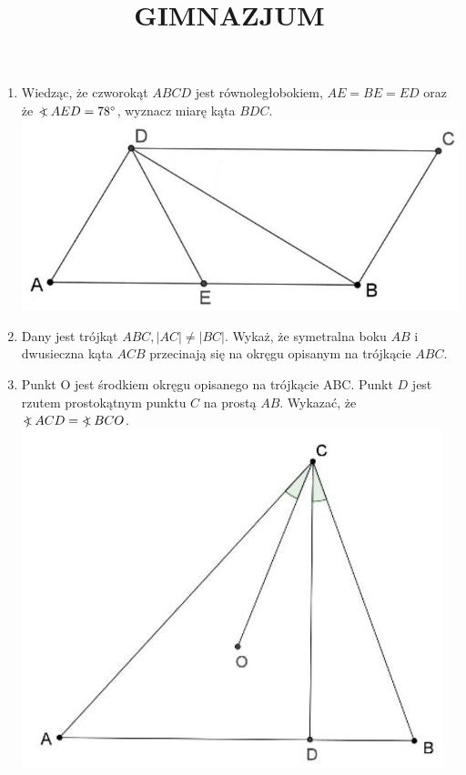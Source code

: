 \documentclass[10pt]{article}
\title{GIMNAZJUM }
\author{}
\date{}
\newcommand\Varangle{\mathop{{<\!\!\!\!\!\text{\small)}}\:}\nolimits}
\begin{document}
\maketitle
\begin{enumerate}
  \item Wiedząc, że czworokąt \(A B C D\) jest równoległobokiem, \(A E=B E=E D\) oraz że \(\Varangle A E D=78^{\circ}\), wyznacz miarę kąta \(B D C\).\\
\includegraphics[max width=\textwidth, center]{2024_11_21_832da7521aa701459acfg-1(1)}
  \item Dany jest trójkąt \(A B C,|A C| \neq|B C|\). Wykaż, że symetralna boku \(A B\) i dwusieczna kąta \(A C B\) przecinają się na okręgu opisanym na trójkącie \(A B C\).
  \item Punkt O jest środkiem okręgu opisanego na trójkącie ABC. Punkt \(D\) jest rzutem prostokątnym punktu \(C\) na prostą \(A B\). Wykazać, że \(\Varangle A C D=\Varangle B C O\).\\
\includegraphics[max width=\textwidth, center]{2024_11_21_832da7521aa701459acfg-1(2)}
\end{enumerate}
\end{document}
